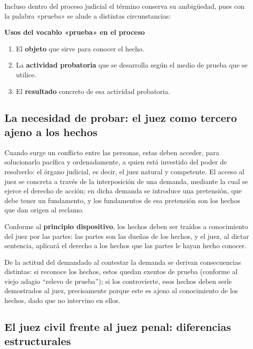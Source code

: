 \documentclass[12pt,oneside]{book}
\begin{document}
Incluso dentro del proceso judicial el término conserva su ambigüedad, pues con la palabra «prueba» se alude a distintas circunstancias:

\begin{important}
\textbf{Usos del vocablo «prueba» en el proceso}
\begin{enumerate}[label=\arabic*)]
    \item El \textbf{objeto} que sirve para conocer el hecho.
    \item La \textbf{actividad probatoria} que se desarrolla según el medio de prueba que se utilice.
    \item El \textbf{resultado} concreto de esa actividad probatoria.
\end{enumerate}
\end{important}

\subsection{La necesidad de probar: el juez como tercero ajeno a los hechos}

Cuando surge un conflicto entre las personas, estas deben acceder, para solucionarlo pacífica y ordenadamente, a quien está investido del poder de resolverlo: el órgano judicial, es decir, el juez natural y competente. El acceso al juez se concreta a través de la interposición de una demanda, mediante la cual se ejerce el derecho de acción; en dicha demanda se introduce una pretensión, que debe tener un fundamento, y los fundamentos de esa pretensión son los hechos que dan origen al reclamo.

Conforme al \textbf{principio dispositivo}, los hechos deben ser traídos a conocimiento del juez por las partes: las partes son las dueñas de los hechos, y el juez, al dictar sentencia, aplicará el derecho a los hechos que las partes le hayan hecho conocer.

De la actitud del demandado al contestar la demanda se derivan consecuencias distintas: si reconoce los hechos, estos quedan exentos de prueba (conforme al viejo adagio ``relevo de prueba''); si los controvierte, esos hechos deben serle demostrados al juez, precisamente porque este es ajeno al conocimiento de los hechos, dado que no intervino en ellos.

\subsection{El juez civil frente al juez penal: diferencias estructurales}
\end{document}
